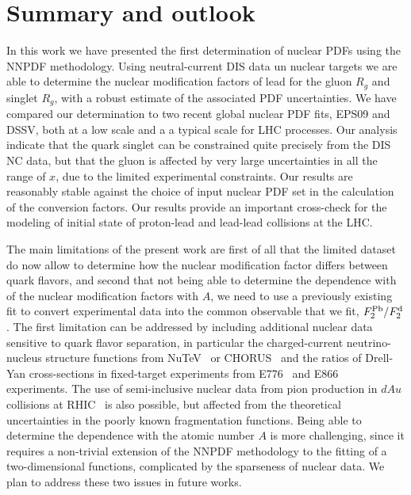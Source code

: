 
\section{Summary and outlook}

In this work we have presented the first determination
of nuclear PDFs using the NNPDF methodology.
%
Using neutral-current DIS data un nuclear targets we are able to determine the nuclear modification
factors of lead for the gluon $R_{g}$ and singlet $R_{g}$, with a robust estimate of the associated
PDF uncertainties.
%
We have compared our determination to two recent global nuclear PDF fits, EPS09 and DSSV, both at a low scale
and a a typical scale for LHC processes.
%
Our analysis indicate that the quark singlet can be constrained quite precisely from the DIS NC data, but that the gluon is affected by
very large uncertainties in all the range of $x$, due to the limited experimental constraints.
%
Our results are reasonably stable against the choice of input nuclear PDF set in the calculation
of the conversion factors.
%
Our results provide an important cross-check for the modeling of initial state
of proton-lead and lead-lead collisions at the LHC.

The main limitations of the present work are first of all that the limited dataset do now allow to determine
how the nuclear modification factor differs between quark flavors, and second that not being able to determine
the dependence with of the nuclear modification factors with $A$, we need to use a previously existing fit to convert experimental data
into the common observable that we fit, $F_2^{\rm Pb}/F_2^{\rm d}$.
%
The first limitation can be addressed by including additional nuclear data sensitive to quark flavor separation,
in particular the charged-current neutrino-nucleus structure functions from NuTeV~\cite{Tzanov:2005kr} or CHORUS~\cite{Onengut:2005kv} and the ratios of
Drell-Yan cross-sections in fixed-target experiments from E776~\cite{Alde:1990im} and E866~\cite{Vasilev:1999fa}
experiments.
%
The use of semi-inclusive nuclear data from pion production in $dAu$ collisions at RHIC~\cite{Adler:2006wg,Abelev:2009hx,} is also possible, but
affected from the theoretical uncertainties in the poorly known fragmentation functions.
%
Being able to determine the dependence with the atomic number $A$ is more challenging, since it requires a non-trivial
extension of the NNPDF methodology to the fitting of a two-dimensional functions, complicated by the sparseness
of nuclear data.
%
We plan to address these two issues in future works.


